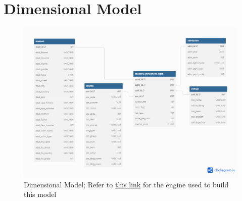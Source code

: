 \chapter{Dimensional Model}

\begin{figure}[H]
    \centering
    \includegraphics[width=\linewidth]{images/schema.png}
    \caption{Dimensional Model; Refer to \href{https://dbdiagram.io/d/Data-Warehousing-dimensional-modelling-651d1dc4ffbf5169f0001270}{this link} for the engine used to build this model}
\end{figure}
